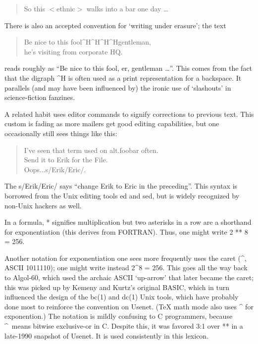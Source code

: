 \begin{quote}
	So this $<$ethnic$>$ walks into a bar one day \dots
\end{quote}

There is also an accepted convention for `writing under erasure'; the text

\begin{quote}
	Be nice to this fool\^{}H\^{}H\^{}H\^{}Hgentleman,\\
	he's visiting from corporate HQ.
\end{quote}

reads roughly as ``Be nice to this fool, er, gentleman \dots''. This comes from
the fact that the digraph \^{}H is often used as a print representation for a
backspace. It parallels (and may have been influenced by) the ironic use of
`slashouts' in science-fiction fanzines.

A related habit uses editor commands to signify corrections to previous text.
This custom is fading as more mailers get good editing capabilities, but one
occasionally still sees things like this:

\begin{quote}
	I've seen that term used on alt.foobar often.\\
	Send it to Erik for the File.\\
	Oops...s/Erik/Eric/.
\end{quote}

The s/Erik/Eric/ says ``change Erik to Eric in the preceding''. This syntax is
borrowed from the Unix editing tools ed and sed, but is widely recognized by
non-Unix hackers as well.

In a formula, * signifies multiplication but two asterisks in a row are a
shorthand for exponentiation (this derives from FORTRAN). Thus, one might write
2 ** 8 = 256.

Another notation for exponentiation one sees more frequently uses the caret
(\^{}, ASCII 1011110); one might write instead 2\^{}8 = 256.  This goes all the
way back to Algol-60, which used the archaic ASCII `up-arrow' that later became
the caret; this was picked up by Kemeny and Kurtz's original BASIC, which in
turn influenced the design of the bc(1) and dc(1) Unix tools, which have
probably done most to reinforce the convention on Usenet. (TeX math mode also
uses \^{} for exponention.) The notation is mildly confusing to C programmers,
because \^{}\ means bitwise exclusive-or in C. Despite this, it was favored 3:1
over ** in a late-1990 snapshot of Usenet. It is used consistently in this
lexicon.

